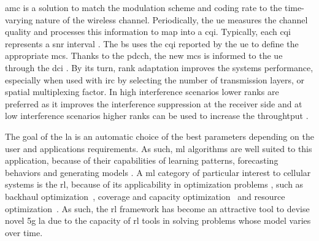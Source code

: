 \Gls{amc} is a solution to match the modulation scheme and coding rate to the time-varying nature of the wireless channel.
%
Periodically, the \gls{ue} measures the channel quality and processes this information to map into a \gls{cqi}.
%
Typically, each \gls{cqi} represents a \gls{snr} interval \cite{Blanquez-Casado2016}.
%
The \gls{bs} uses the \gls{cqi} reported by the \gls{ue} to define the appropriate \gls{mcs}.
%
Thanks to the \gls{pdcch}, the new \gls{mcs} is informed to the \gls{ue} through the \gls{dci} \cite{ErikDahlman5G}.
%
By its turn, rank adaptation improves the systems performance, especially when used with \gls{irc} by selecting the number of transmission layers, or spatial multiplexing factor.
%
In high interference scenarios lower ranks are preferred as it improves the interference suppression at the receiver side and at low interference scenarios higher ranks can be used to increase the throughtput \cite{catania2015distributed}.
%

The goal of the \gls{la} is an automatic choice of the best parameters depending on the user and applications requirements.
%
As such, \gls{ml} algorithms are well suited to this application, because of their capabilities of learning patterns, forecasting behaviors and generating models \cite{survey-son}.
%
A \gls{ml} category of particular interest to cellular systems is the \gls{rl}, because of its applicability in optimization problems \cite{survey-son}, such as backhaul optimization~\cite{jaber2015}, coverage and capacity optimization~\cite{Fan2014} and resource optimization~\cite{Miozzo2017SwitchOnOffPF}.
%
As such, the \gls{rl} framework has become an attractive tool to devise novel \gls{5g} \gls{la} due to the capacity of \gls{rl} tools in solving problems whose model varies over time.
%
%
%

